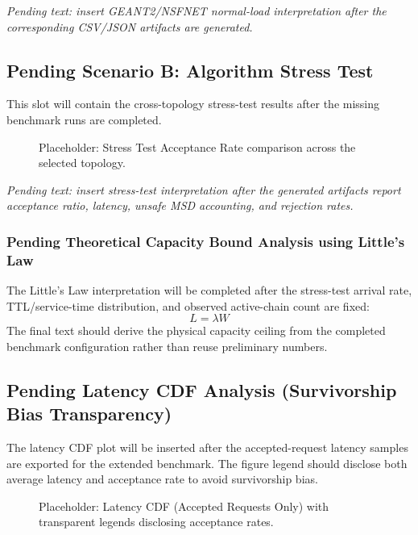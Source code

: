\documentclass[12pt, a4paper, reqno, oneside]{book}
\begin{document}
\textit{Pending text: insert GEANT2/NSFNET normal-load interpretation after the corresponding CSV/JSON artifacts are generated.}

\subsection{Pending Scenario B: Algorithm Stress Test}
This slot will contain the cross-topology stress-test results after the missing benchmark runs are completed.

\begin{figure}[H]
    \centering
    \vspace{6cm}
    \caption{Placeholder: Stress Test Acceptance Rate comparison across the selected topology.}
    \label{fig:stress_test_acc}
\end{figure}

\textit{Pending text: insert stress-test interpretation after the generated artifacts report acceptance ratio, latency, unsafe MSD accounting, and rejection rates.}

\subsubsection{Pending Theoretical Capacity Bound Analysis using Little's Law}
The Little's Law interpretation will be completed after the stress-test arrival rate, TTL/service-time distribution, and observed active-chain count are fixed:
\begin{equation}
L = \lambda W
\end{equation}
The final text should derive the physical capacity ceiling from the completed benchmark configuration rather than reuse preliminary numbers.

\subsection{Pending Latency CDF Analysis (Survivorship Bias Transparency)}
The latency CDF plot will be inserted after the accepted-request latency samples are exported for the extended benchmark. The figure legend should disclose both average latency and acceptance rate to avoid survivorship bias.

\begin{figure}[H]
    \centering
    \vspace{6cm}
    \caption{Placeholder: Latency CDF (Accepted Requests Only) with transparent legends disclosing acceptance rates.}
    \label{fig:latency_cdf_final}
\end{figure}
\end{document}
